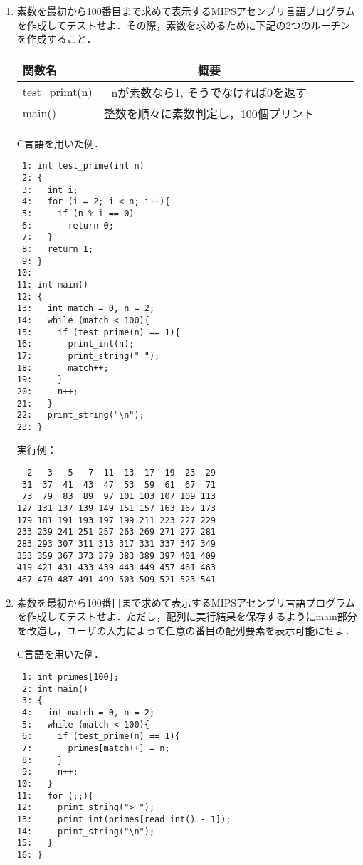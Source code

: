 \documentclass[a4j]{jarticle}
\begin{document}
\begin{enumerate}
\item 素数を最初から100番目まで求めて表示するMIPSアセンブリ言語プログラムを作成してテストせよ．その際，素数を求めるために下記の2つのルーチンを作成すること．

\begin{center}
\begin{tabular}{lclcl}\hline
\centering
関数名&概要\\ \hline
test_primt(n)&nが素数なら1, そうでなければ0を返す\\ \hline
main()&整数を順々に素数判定し，100個プリント\\ \hline
\end{tabular}
\end{center}

C言語を用いた例．

{\baselineskip 3mm
\begin{verbatim}
 1: int test_prime(int n)
 2: {
 3:   int i;
 4:   for (i = 2; i < n; i++){
 5:     if (n % i == 0)
 6:       return 0;
 7:   }
 8:   return 1;
 9: }
10: 
11: int main()
12: {
13:   int match = 0, n = 2;
14:   while (match < 100){
15:     if (test_prime(n) == 1){
16:       print_int(n);
17:       print_string(" ");
18:       match++;
19:     }
20:     n++;
21:   }
22:   print_string("\n");
23: }
\end{verbatim}
}

実行例：

{\baselineskip 3mm
\begin{verbatim}
  2   3   5   7  11  13  17  19  23  29
 31  37  41  43  47  53  59  61  67  71
 73  79  83  89  97 101 103 107 109 113
127 131 137 139 149 151 157 163 167 173
179 181 191 193 197 199 211 223 227 229
233 239 241 251 257 263 269 271 277 281
283 293 307 311 313 317 331 337 347 349
353 359 367 373 379 383 389 397 401 409
419 421 431 433 439 443 449 457 461 463
467 479 487 491 499 503 509 521 523 541
\end{verbatim}
}


\item 素数を最初から100番目まで求めて表示するMIPSアセンブリ言語プログラムを作成してテストせよ．ただし，配列に実行結果を保存するようにmain部分を改造し，ユーザの入力によって任意の番目の配列要素を表示可能にせよ．

C言語を用いた例．

{\baselineskip 3mm
\begin{verbatim}
 1: int primes[100];
 2: int main()
 3: {
 4:   int match = 0, n = 2;
 5:   while (match < 100){
 6:     if (test_prime(n) == 1){
 7:       primes[match++] = n;
 8:     }
 9:     n++;
10:   }
11:   for (;;){
12:     print_string("> ");
13:     print_int(primes[read_int() - 1]);
14:     print_string("\n");
15:   }
16: }
\end{verbatim}
}



\end{enumerate}
\end{document}

